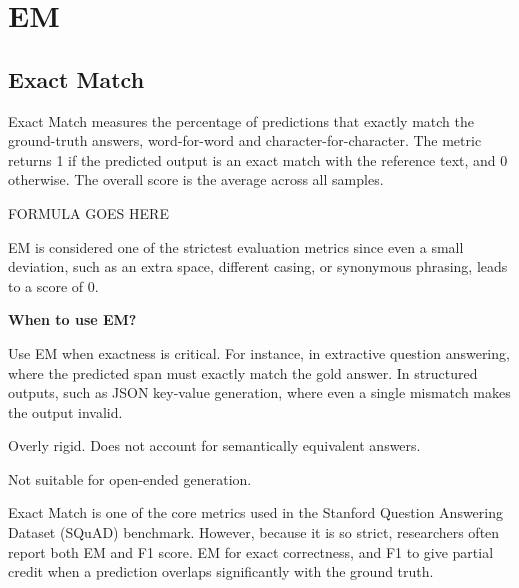 \clearpage
\thispagestyle{nlpstyle}
\section{EM}
\subsection{Exact Match}

Exact Match measures the percentage of predictions that exactly match the ground-truth answers,
word-for-word and character-for-character. The metric returns 1 if the predicted output is an
exact match with the reference text, and 0 otherwise. The overall score is the average across all
samples.

\begin{center}
    FORMULA GOES HERE
\end{center}

EM is considered one of the strictest evaluation metrics since even a small deviation, such as an
extra space, different casing, or synonymous phrasing, leads to a score of 0.

\textbf{When to use EM?}

Use EM when exactness is critical. For instance, in extractive question answering, where the predicted
span must exactly match the gold answer. In structured outputs, such as JSON key-value generation,
where even a single mismatch makes the output invalid.

{
\item Overly rigid. Does not account for semantically equivalent answers.
\item Not suitable for open-ended generation.
}

\clearpage

{Exact Match is one of the core metrics used in the Stanford Question Answering Dataset (SQuAD)
benchmark. However, because it is so strict, researchers often report both EM and F1 score.
EM for exact correctness, and F1 to give partial credit when a prediction overlaps significantly with
the ground truth.}